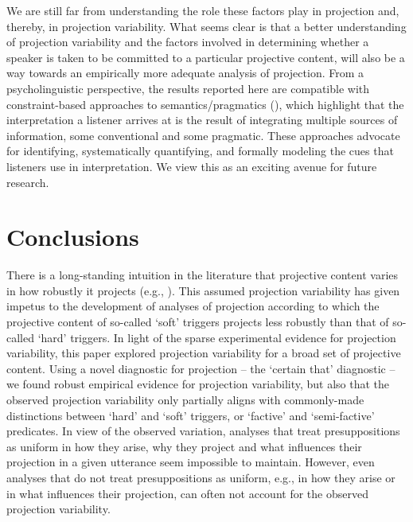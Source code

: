 \documentclass[11pt,fleqn]{article}
\newcommand{\6}{\mbox{$[\hspace*{-.6mm}[$}}
\newcommand{\9}{\mbox{$]\hspace*{-.6mm}]$}}
\begin{document}
We are still far from understanding the role these factors play in projection and, thereby, in projection variability. What seems clear is that a better understanding of projection variability and the factors involved in determining whether a speaker is taken to be committed to a particular projective content, will also be a way towards an empirically more adequate analysis of projection. From a psycholinguistic perspective, the results reported here are compatible with constraint-based approaches to semantics/pragmatics (\citealt{degentanenhaus2015}), which highlight that the interpretation a listener arrives at is the result of integrating multiple sources of information, some conventional and some pragmatic. These approaches advocate for identifying, systematically quantifying, and formally modeling the cues that listeners use in interpretation. We view this as an exciting avenue for future research.


\section{Conclusions}\label{s6}

There is a long-standing intuition in the literature that projective content varies in how robustly it projects (e.g., \citealt{karttunen71b,simons01,abusch10}). This assumed projection variability has given impetus to the development of analyses of projection according to which the projective content of so-called `soft' triggers projects less robustly than that of so-called `hard' triggers. In light of the sparse experimental evidence for projection variability, this paper explored projection variability for a broad set of projective content. Using a novel diagnostic for projection -- the `certain that' diagnostic -- we found robust empirical evidence for projection variability, but also that the observed projection variability only partially aligns with commonly-made distinctions between `hard' and `soft' triggers, or `factive' and `semi-factive' predicates. In view of the observed variation, analyses that treat presuppositions as uniform in how they arise, why they project and what influences their projection in a given utterance seem impossible to maintain. However, even analyses that do not treat presuppositions as uniform, e.g., in how they arise or in what influences their projection, can often not account for the observed projection variability. 
\end{document}
